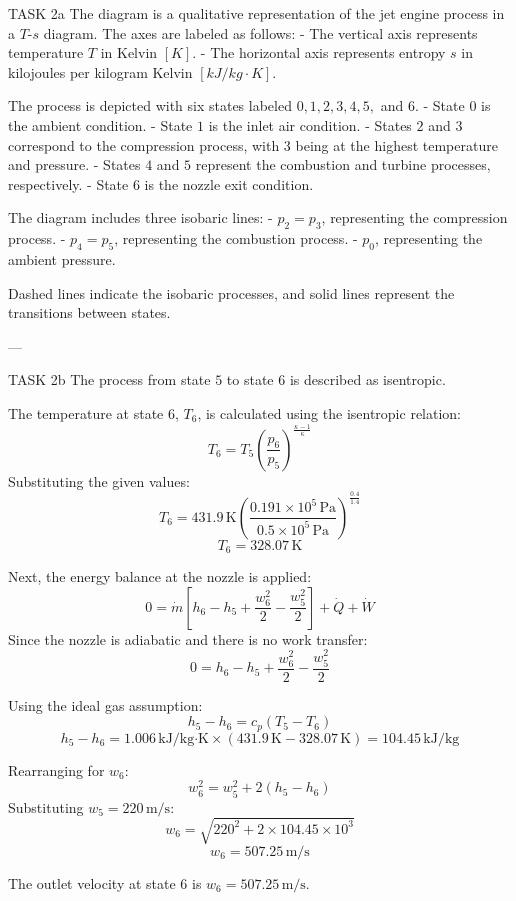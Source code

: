 TASK 2a  
The diagram is a qualitative representation of the jet engine process in a \( T \)-\( s \) diagram. The axes are labeled as follows:  
- The vertical axis represents temperature \( T \) in Kelvin \([K]\).  
- The horizontal axis represents entropy \( s \) in kilojoules per kilogram Kelvin \([kJ/kg·K]\).  

The process is depicted with six states labeled \( 0, 1, 2, 3, 4, 5, \) and \( 6 \).  
- State \( 0 \) is the ambient condition.  
- State \( 1 \) is the inlet air condition.  
- States \( 2 \) and \( 3 \) correspond to the compression process, with \( 3 \) being at the highest temperature and pressure.  
- States \( 4 \) and \( 5 \) represent the combustion and turbine processes, respectively.  
- State \( 6 \) is the nozzle exit condition.  

The diagram includes three isobaric lines:  
- \( p_2 = p_3 \), representing the compression process.  
- \( p_4 = p_5 \), representing the combustion process.  
- \( p_0 \), representing the ambient pressure.  

Dashed lines indicate the isobaric processes, and solid lines represent the transitions between states.

---

TASK 2b  
The process from state \( 5 \) to state \( 6 \) is described as isentropic.  

The temperature at state \( 6 \), \( T_6 \), is calculated using the isentropic relation:  
\[
T_6 = T_5 \left( \frac{p_6}{p_5} \right)^{\frac{\kappa - 1}{\kappa}}
\]  
Substituting the given values:  
\[
T_6 = 431.9 \, \text{K} \left( \frac{0.191 \times 10^5 \, \text{Pa}}{0.5 \times 10^5 \, \text{Pa}} \right)^{\frac{0.4}{1.4}}
\]  
\[
T_6 = 328.07 \, \text{K}
\]  

Next, the energy balance at the nozzle is applied:  
\[
0 = \dot{m} \left[ h_6 - h_5 + \frac{w_6^2}{2} - \frac{w_5^2}{2} \right] + \dot{Q} + \dot{W}
\]  
Since the nozzle is adiabatic and there is no work transfer:  
\[
0 = h_6 - h_5 + \frac{w_6^2}{2} - \frac{w_5^2}{2}
\]  

Using the ideal gas assumption:  
\[
h_5 - h_6 = c_p (T_5 - T_6)
\]  
\[
h_5 - h_6 = 1.006 \, \text{kJ/kg·K} \times (431.9 \, \text{K} - 328.07 \, \text{K}) = 104.45 \, \text{kJ/kg}
\]  

Rearranging for \( w_6 \):  
\[
w_6^2 = w_5^2 + 2 (h_5 - h_6)
\]  
Substituting \( w_5 = 220 \, \text{m/s} \):  
\[
w_6 = \sqrt{220^2 + 2 \times 104.45 \times 10^3}
\]  
\[
w_6 = 507.25 \, \text{m/s}
\]  

The outlet velocity at state \( 6 \) is \( w_6 = 507.25 \, \text{m/s} \).